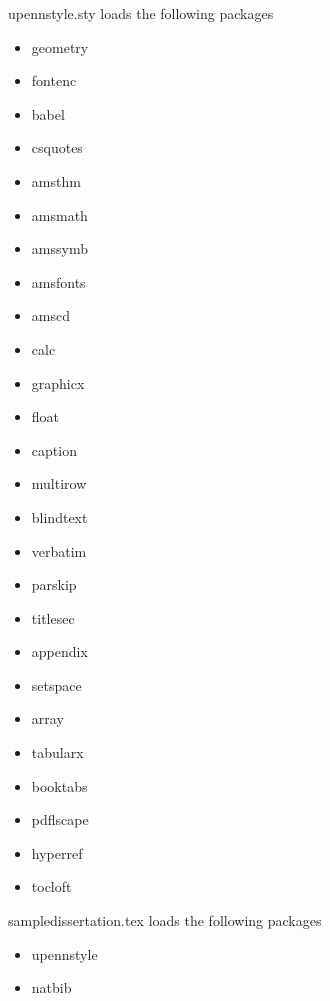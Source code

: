 
upennstyle.sty loads the following packages
\begin{itemize}
\item geometry 
\item fontenc
\item babel
\item csquotes
\item amsthm
\item amsmath
\item amssymb
\item amsfonts
\item amscd
\item calc
\item graphicx
\item float
\item caption
\item multirow
\item blindtext
\item verbatim
\item parskip
\item titlesec
\item appendix
\item setspace
\item array
\item tabularx
\item booktabs
\item pdflscape
\item hyperref
\item tocloft
\end{itemize}

sampledissertation.tex loads the following packages
\begin{itemize}
\item upennstyle
\item natbib
\end{itemize}